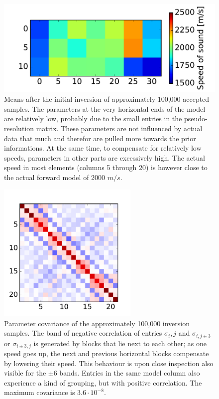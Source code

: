 \begin{figure}
	\centering
	
	\includegraphics[width=1\textwidth]{figures/tomography/tomography_1/tomographyMeans}
	
	\caption{Means after the initial inversion of approximately 100,000 accepted samples. The parameters at the very horizontal ends of the model are relatively low, probably due to the small entries in the pseudo-resolution matrix. These parameters are not influenced by actual data that much and therefor are pulled more towards the prior informations. At the same time, to compensate for relatively low speeds, parameters in other parts are excessively high. The actual speed in most elements (columns 5 through 20) is however close to the actual forward model of 2000 $m/s$.}
	\label{fig:linear_tomography.model1.means}
\end{figure}

\begin{figure}
	\centering
	
	\includegraphics[width=0.6\textwidth]{figures/tomography/tomography_1/tomographyCovariance}
	
	\caption{Parameter covariance of the approximately 100,000 inversion samples. The band of negative correlation of entries $\sigma_i,j$ and $\sigma_{i,j\pm3}$ or $\sigma_{i\pm3,j}$ is generated by blocks that lie next to each other; as one speed goes up, the next and previous horizontal blocks compensate by lowering their speed. This behaviour is upon close inspection also visible for the $\pm6$ bands. Entries in the same model column also experience a kind of grouping, but with positive correlation. The maximum covariance is $3.6 \cdot 10^{-8}$.}
	\label{fig:linear_tomography.model1.covariance}
\end{figure}

